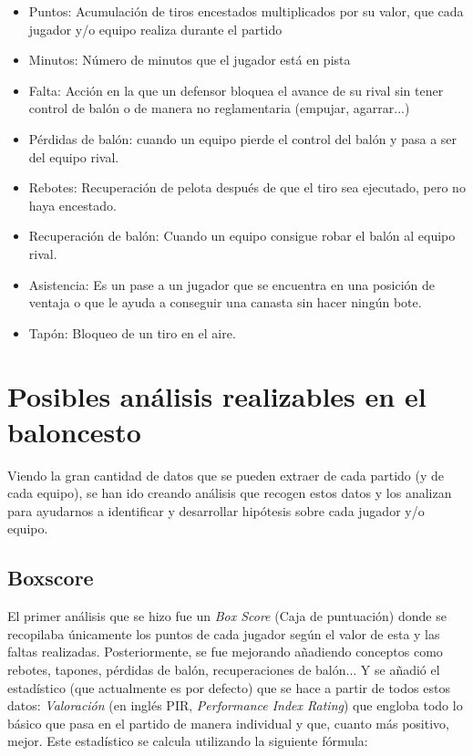 \documentclass[paper=a4, fontsize=9pt]{article}
\begin{document}
\begin{itemize}

\item Puntos: Acumulación de tiros encestados multiplicados por su valor, que cada jugador y/o equipo realiza durante el partido
\item Minutos: Número de minutos que el jugador está en pista
\item Falta: Acción en la que un defensor bloquea el avance de su rival sin tener control de balón o de manera no reglamentaria (empujar, agarrar...)
\item Pérdidas de balón: cuando un equipo pierde el control del balón y pasa a ser del equipo rival.
\item Rebotes: Recuperación de pelota después de que el tiro sea ejecutado, pero no haya encestado.
\item Recuperación de balón: Cuando un equipo consigue robar el balón al equipo rival.
\item Asistencia: Es un pase a un jugador que se encuentra en una posición de ventaja o que le ayuda a conseguir una canasta sin hacer ningún bote.
\item Tapón: Bloqueo de un tiro en el aire.

\end{itemize}



\section{Posibles análisis realizables en el baloncesto}

Viendo la gran cantidad de datos que se pueden extraer de cada partido (y de cada equipo), se han ido creando análisis que recogen estos datos y los analizan para ayudarnos a identificar y desarrollar hipótesis sobre cada jugador y/o equipo.

\subsection{Boxscore}

El primer análisis que se hizo fue un \emph{Box Score} (Caja de puntuación) donde se recopilaba únicamente los puntos de cada jugador según el valor de esta y las faltas realizadas. Posteriormente, se fue mejorando añadiendo conceptos como rebotes, tapones, pérdidas de balón, recuperaciones de balón... Y se añadió el estadístico (que actualmente es por defecto) que se hace a partir de todos estos datos: \emph{Valoración} (en inglés PIR, \emph{Performance Index Rating}) que engloba todo lo básico que pasa en el partido de manera individual y que, cuanto más positivo, mejor. Este estadístico se calcula utilizando la siguiente fórmula:
\end{document}
